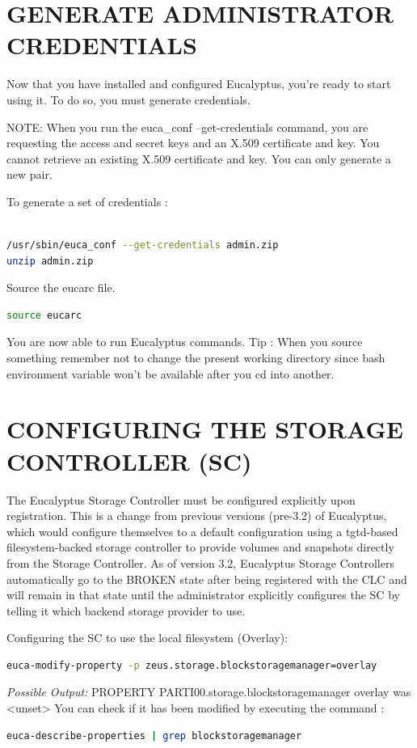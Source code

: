 \section{GENERATE ADMINISTRATOR CREDENTIALS}

Now that you have installed and configured Eucalyptus, you're ready to start using it. To do so, you must generate credentials.

NOTE: When you run the euca\_conf --get-credentials command, you are requesting the access and secret keys and an X.509 certificate and key. You cannot retrieve an existing X.509 certificate and key. You can only generate a new pair.

To generate a set of credentials :
\begin{lstlisting}[language=bash]

/usr/sbin/euca_conf --get-credentials admin.zip
unzip admin.zip
\end{lstlisting}
Source the eucarc file.
\begin{lstlisting}[language=bash]
source eucarc
\end{lstlisting}
You are now able to run Eucalyptus commands.
Tip :  When you source something remember not to change the present working directory since bash environment variable won't be available after you cd into another.

\section{CONFIGURING THE STORAGE CONTROLLER (SC)}
The Eucalyptus Storage Controller must be configured explicitly upon registration. This is a change from previous versions (pre-3.2) of Eucalyptus, which would configure themselves to a default configuration using a tgtd-based filesystem-backed storage controller to provide volumes and snapshots directly from the Storage Controller. As of version 3.2, Eucalyptus Storage Controllers automatically go to the BROKEN state after being registered with the CLC and will remain in that state until the administrator explicitly configures the SC by telling it which backend storage provider to use.


Configuring the SC to use the local filesystem (Overlay):
\begin{lstlisting}[language=bash]
euca-modify-property -p zeus.storage.blockstoragemanager=overlay
\end{lstlisting}
\textit{Possible Output:}
PROPERTY	PARTI00.storage.blockstoragemanager	overlay was <unset>
You can check if it has been modified by executing the command :
\begin{lstlisting}[language=bash]
	euca-describe-properties | grep blockstoragemanager
	\end{lstlisting}
